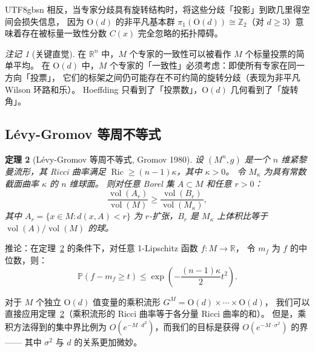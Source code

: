 \documentclass[12pt,a4paper]{article}
\theoremstyle{plain}
\newtheorem{theorem}{定理}[section]
\theoremstyle{definition}
\theoremstyle{remark}
\newtheorem{remark}[theorem]{注记}
\newcommand{\R}{\mathbb{R}}
\newcommand{\Z}{\mathbb{Z}}
\newcommand{\Pbb}{\mathbb{P}}
\newcommand{\Od}{\mathrm{O}(d)}
\DeclareMathOperator{\vol}{vol}
\DeclareMathOperator{\Ric}{Ric}
\begin{document}
\begin{CJK}{UTF8}{gbsn}
相反，当专家分歧具有旋转结构时，将这些分歧「投影」到欧几里得空间会损失信息，
因为 $\Od$ 的非平凡基本群 $\pi_1(\Od) \cong \Z_2$（对 $d \geq 3$）意味着存在被标量一致性分数 $C(x)$ 完全忽略的拓扑障碍。

\begin{remark}[关键直觉]
\label{rem:intuition}
在 $\R^n$ 中，$M$ 个专家的一致性可以被看作 $M$ 个标量投票的简单平均。
在 $\Od$ 中，$M$ 个专家的「一致性」必须考虑：即使所有专家在同一方向「投票」，
它们的标架之间仍可能存在不可约简的旋转分歧（表现为非平凡 Wilson 环路和乐）。
Hoeffding 只看到了「投票数」，$\Od$ 几何看到了「旋转角」。
\end{remark}

\subsection{Lévy-Gromov 等周不等式}

\begin{theorem}[Lévy-Gromov 等周不等式, Gromov 1980]\label{thm:levy_gromov}
设 $(M^n, g)$ 是一个 $n$ 维紧黎曼流形，其 Ricci 曲率满足 $\Ric \geq (n-1)\kappa$，其中 $\kappa > 0$。
令 $M_\kappa$ 为具有常数截面曲率 $\kappa$ 的 $n$ 维球面。
则对任意 Borel 集 $A \subset M$ 和任意 $r > 0$：
\begin{equation}
    \frac{\vol(A_r)}{\vol(M)} \geq \frac{\vol(B_r)}{\vol(M_\kappa)},
\end{equation}
其中 $A_r = \{x \in M : d(x, A) < r\}$ 为 $r$-扩张，$B_r$ 是 $M_\kappa$ 上体积比等于 $\vol(A)/\vol(M)$ 的球。
\end{theorem}

推论：在定理~\ref{thm:levy_gromov} 的条件下，对任意 1-Lipschitz 函数 $f: M \to \R$，
令 $m_f$ 为 $f$ 的中位数，则：
\begin{equation}\label{eq:levy_conc}
    \Pbb(f - m_f \geq t) \leq \exp\!\left(-\frac{(n-1)\kappa}{2}t^2\right).
\end{equation}

对于 $M$ 个独立 $\Od$ 值变量的乘积流形 $G^M = \Od \times \cdots \times \Od$，
我们可以直接应用定理~\ref{thm:levy_gromov}（乘积流形的 Ricci 曲率等于各分量 Ricci 曲率的和）。
但是，乘积方法得到的集中界比例为 $O(e^{-M \cdot d^2})$，而我们的目标是获得 $O(e^{-M \cdot \sigma^2})$ 的界——
其中 $\sigma^2$ 与 $d$ 的关系更加微妙。

\newpage


\end{CJK}
\end{document}

